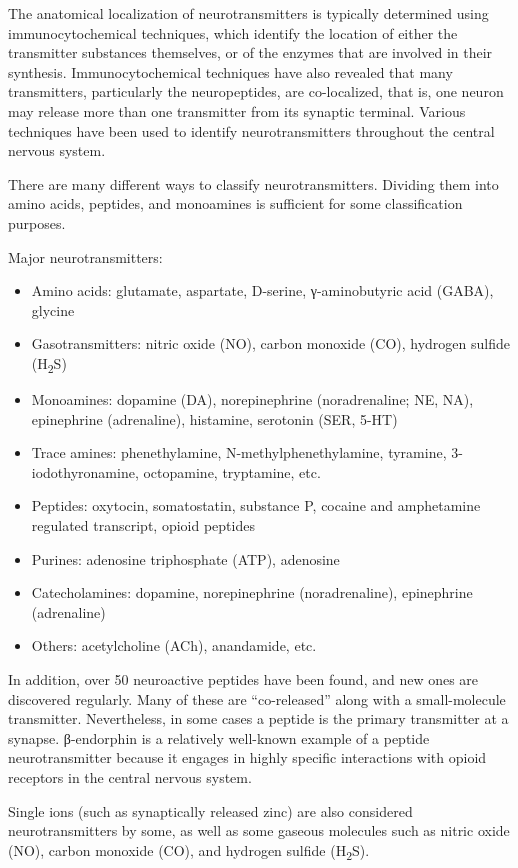 \documentclass[]{book}
\providecommand{\tightlist}{%
  \setlength{\itemsep}{0pt}\setlength{\parskip}{0pt}}
\begin{document}
The anatomical localization of neurotransmitters is typically determined using immunocytochemical techniques, which identify the location of either the transmitter substances themselves, or of the enzymes that are involved in their synthesis. Immunocytochemical techniques have also revealed that many transmitters, particularly the neuropeptides, are co-localized, that is, one neuron may release more than one transmitter from its synaptic terminal. Various techniques have been used to identify neurotransmitters throughout the central nervous system.

There are many different ways to classify neurotransmitters. Dividing them into amino acids, peptides, and monoamines is sufficient for some classification purposes.

Major neurotransmitters:

\begin{itemize}
\tightlist
\item
  Amino acids: glutamate, aspartate, D-serine, γ-aminobutyric acid (GABA), glycine
\item
  Gasotransmitters: nitric oxide (NO), carbon monoxide (CO), hydrogen sulfide (H\textsubscript{2}S)
\item
  Monoamines: dopamine (DA), norepinephrine (noradrenaline; NE, NA), epinephrine (adrenaline), histamine, serotonin (SER, 5-HT)
\item
  Trace amines: phenethylamine, N-methylphenethylamine, tyramine, 3-iodothyronamine, octopamine, tryptamine, etc.
\item
  Peptides: oxytocin, somatostatin, substance P, cocaine and amphetamine regulated transcript, opioid peptides
\item
  Purines: adenosine triphosphate (ATP), adenosine
\item
  Catecholamines: dopamine, norepinephrine (noradrenaline), epinephrine (adrenaline)
\item
  Others: acetylcholine (ACh), anandamide, etc.
\end{itemize}

In addition, over 50 neuroactive peptides have been found, and new ones are discovered regularly. Many of these are ``co-released'' along with a small-molecule transmitter. Nevertheless, in some cases a peptide is the primary transmitter at a synapse. β-endorphin is a relatively well-known example of a peptide neurotransmitter because it engages in highly specific interactions with opioid receptors in the central nervous system.

Single ions (such as synaptically released zinc) are also considered neurotransmitters by some, as well as some gaseous molecules such as nitric oxide (NO), carbon monoxide (CO), and hydrogen sulfide (H\textsubscript{2}S).
\end{document}
